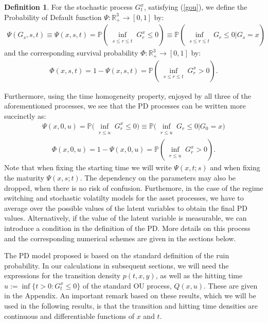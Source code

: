 \documentclass[11pt,reqno]{article}
\theoremstyle{definition}
\newtheorem{definition}[theorem]{Definition}
\begin{document}
\begin{definition}\label{PD_def}
	For the stochastic process $G_t^x$, satisfying (\ref{gou}), we define the Probability of Default function $\Psi: \mathbb{R}_+^3 \rightarrow [0,1]$ by:
	\begin{eqnarray}
		\Psi(G_s,s,t)\equiv \Psi(x,s,t) = \mathbb{P}(\inf_{\substack{s \leq r \leq t}} G_r^x \leq 0) \equiv \mathbb{P}(\inf_{\substack{s \leq r \leq t}} G_r \leq 0 | G_s=x) 
	\end{eqnarray} and the corresponding survival probability $\Phi: \mathbb{R}_+^3 \rightarrow [0,1]$ by:
	\begin{eqnarray}
		\Phi(x,s,t) = 1- \Psi(x,s,t)=\mathbb{P}(\inf_{\substack{s \leq r \leq t}} G_r^x > 0).
	\end{eqnarray}
\end{definition}
Furthermore, using the time homogeneity property, enjoyed by all three of the aforementioned processes, we see that the PD processes can be written more succinctly as: 
\begin{eqnarray}
	\Psi(x,0,u)  = \mathbb{P}\big(\inf_{\substack{r \leq u}} G_r^x \leq 0\big) \equiv \mathbb{P}\big(\inf_{\substack{ r \leq u}} G_r \leq 0 | G_0=x\big) 
\end{eqnarray}
\begin{eqnarray}
	\Phi(x,0,u) = 1- \Psi(x,0,u)=\mathbb{P}(\inf_{\substack{ r \leq u}} G_r^x > 0).
\end{eqnarray}
Note that when fixing the starting time we will write $\Psi(x,t;s)$ and when fixing the maturity $\Psi(x,s;t)$. The dependency on the parameters may also be dropped, when there is no risk of confusion. Furthemore, in the case of the regime switching and stochastic volatilty models for the asset processes, we have to average over the possible values of the latent variables to obtain the final PD values. Alternatively, if the value of the latent variable is measurable, we can introduce a condition in the definition of the PD. More details on this process and the corresponding numerical schemes are given in the sections below. 
\par The PD model proposed is based on the standard definition of the ruin probability. In our calculations in subsequent sections, we will need the expressions for the transition density $p(t,x,y)$, as well as the hitting time $u := \inf\{t>0: G_t^x \leq 0\}$ of the standard OU process, $Q(x,u)$. These are given in the Appendix. An important remark based on these results, which we will be used in the following results, is that the transition and hitting time densities are continuous and differentiable functions of $x$ and $t$. 
\end{document}
